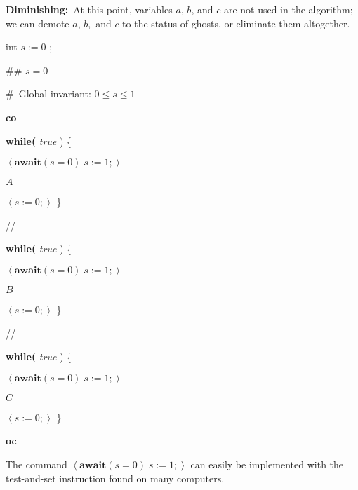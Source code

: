 \documentclass[11pt]{article}%
\begin{document}
\textbf{Diminishing:}\ At this point, variables $a$, $b$, and $c$ are not used
in the algorithm; we can demote $a$, $b,$ and $c$ to the status of ghosts, or
eliminate them altogether.

\begin{code}
int $s:=0$ ;

\#\# $s=0$

\#\ Global invariant: $0\leq s\leq1$

\textbf{co}

\begin{indent}
\item \textbf{while(} \textit{true} ) \{

\begin{indent}
\item $\left\langle \mathbf{await}(s=0)\;s:=1;\right\rangle $

\item $A$

\item $\left\langle s:=0;\right\rangle $ \}
\end{indent}
\end{indent}

//

\begin{indent}
\item \textbf{while(} \textit{true} ) \{

\begin{indent}
\item $\left\langle \mathbf{await}(s=0)\;s:=1;\right\rangle $

\item $B$

\item $\left\langle s:=0;\right\rangle $ \}
\end{indent}
\end{indent}

//

\begin{indent}
\item \textbf{while(} \textit{true} ) \{

\begin{indent}
\item $\left\langle \mathbf{await}(s=0)\;s:=1;\right\rangle $

\item $C$

\item $\left\langle s:=0;\right\rangle $ \}
\end{indent}
\end{indent}

\textbf{oc}
\end{code}

The command $\left\langle \mathbf{await}(s=0)\;s:=1;\right\rangle $ can easily
be implemented with the test-and-set instruction found on many computers.



\end{document}
